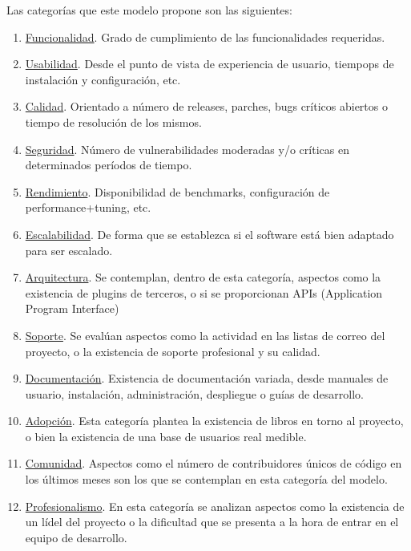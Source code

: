 \documentclass[11pt]{article}
\begin{document}
\begin{itemize}
Las categorías que este modelo propone son las siguientes:
\begin{enumerate}
\item{\underline{Funcionalidad}}. Grado de cumplimiento de las funcionalidades requeridas.
\item{\underline{Usabilidad}}. Desde el punto de vista de experiencia de usuario, tiempops de instalación y configuración, etc.
\item{\underline{Calidad}}. Orientado a número de releases, parches, bugs críticos abiertos o tiempo de resolución de los mismos.
\item{\underline{Seguridad}}. Número de vulnerabilidades moderadas y/o críticas en determinados períodos de tiempo.
\item{\underline{Rendimiento}}. Disponibilidad de benchmarks, configuración de performance+tuning, etc.
\item{\underline{Escalabilidad}}. De forma que se establezca si el software está bien adaptado para ser escalado.
\item{\underline{Arquitectura}}. Se contemplan, dentro de esta categoría, aspectos como la existencia de plugins de terceros, o si se proporcionan APIs (Application Program Interface)
\item{\underline{Soporte}}. Se evalúan aspectos como la actividad en las listas de correo del proyecto, o la existencia de soporte profesional y su calidad.
\item{\underline{Documentación}}. Existencia de documentación variada, desde manuales de usuario, instalación, administración, despliegue o guías de desarrollo.
\item{\underline{Adopción}}. Esta categoría plantea la existencia de libros en torno al proyecto, o bien la existencia de una base de usuarios real medible.
\item{\underline{Comunidad}}. Aspectos como el número de contribuidores únicos de código en los últimos meses son los que se contemplan en esta categoría del modelo.
\item{\underline{Profesionalismo}}. En esta categoría se analizan aspectos como la existencia de un lídel del proyecto o la dificultad que se presenta a la hora de entrar en el equipo de desarrollo.
\end{enumerate}


\end{itemize}
\end{document}
